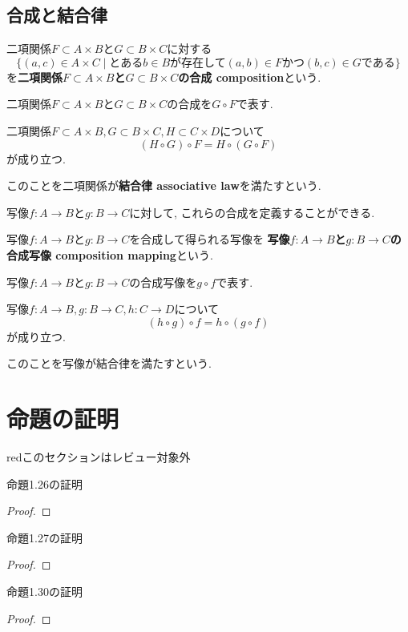 \subsection{合成と結合律}
\begin{Def}
二項関係$F\subset A\times B$と$G\subset B\times C$に対する
\[
\{(a,c)\in A\times C\mid \text{とある}b\in B\text{が存在して}(a,b)\in F \text{かつ} (b,c)\in G\text{である}\}
\]
を{\bf 二項関係$F\subset A\times B$と$G\subset B\times C$の合成 composition}という.
\end{Def}
\begin{Notation}
二項関係$F\subset A\times B$と$G\subset B\times C$の合成を$G\circ F$で表す.
\end{Notation}
\begin{Prop}
二項関係$F\subset A\times B ,G\subset B\times C, H\subset C\times D$について
\[
(H\circ G)\circ F=H\circ (G\circ F)
\]
が成り立つ.
\end{Prop}
\begin{comment}
\begin{proof}
\end{proof}
\end{comment}
このことを二項関係が{\bf 結合律 associative law}を満たすという.
\begin{Prop}
写像$f:A\rightarrow B$と$g:B\rightarrow C$に対して,
これらの合成を定義することができる.
\end{Prop}
\begin{comment}
\begin{proof}
\end{proof}
\end{comment}

\begin{Def}
写像$f:A\rightarrow B$と$g:B\rightarrow C$を合成して得られる写像を
{\bf 写像$f:A\rightarrow B$と$g:B\rightarrow C$の合成写像 composition mapping}という.
\end{Def}
\begin{Notation}
写像$f:A\rightarrow B$と$g:B\rightarrow C$の合成写像を$g\circ f$で表す.
\end{Notation}
\begin{Prop}
写像$f:A\rightarrow B, g:B\rightarrow C,
h:C\rightarrow D$について
\[
(h\circ g)\circ f=h\circ(g\circ f)
\]
が成り立つ.
\end{Prop}
\begin{comment}
\begin{proof}
\end{proof}
\end{comment}
このことを写像が結合律を満たすという.


\section{命題の証明}
\begin{color}{red}このセクションはレビュー対象外\end{color}

命題1.26の証明
\begin{proof}
\end{proof}
命題1.27の証明
\begin{proof}
\end{proof}
命題1.30の証明
\begin{proof}
\end{proof}
